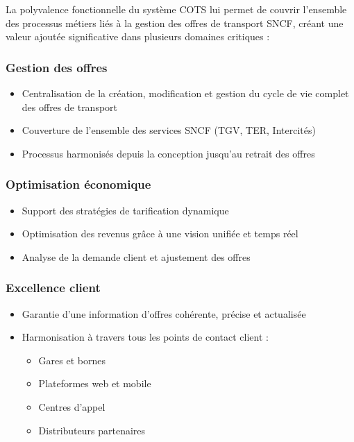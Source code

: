 La polyvalence fonctionnelle du système COTS lui permet de couvrir l'ensemble des processus métiers liés à la gestion des offres de transport SNCF, créant une valeur ajoutée significative dans plusieurs domaines critiques :

\subsubsection{Gestion des offres}
\begin{itemize}
    \item Centralisation de la création, modification et gestion du cycle de vie complet des offres de transport
    \item Couverture de l'ensemble des services SNCF (TGV, TER, Intercités)
    \item Processus harmonisés depuis la conception jusqu'au retrait des offres
\end{itemize}

\subsubsection{Optimisation économique}
\begin{itemize}
    \item Support des stratégies de tarification dynamique
    \item Optimisation des revenus grâce à une vision unifiée et temps réel
    \item Analyse de la demande client et ajustement des offres
\end{itemize}

\subsubsection{Excellence client}
\begin{itemize}
    \item Garantie d'une information d'offres cohérente, précise et actualisée
    \item Harmonisation à travers tous les points de contact client :
    \begin{itemize}
        \item Gares et bornes
        \item Plateformes web et mobile
        \item Centres d'appel
        \item Distributeurs partenaires
    \end{itemize}
\end{itemize}

